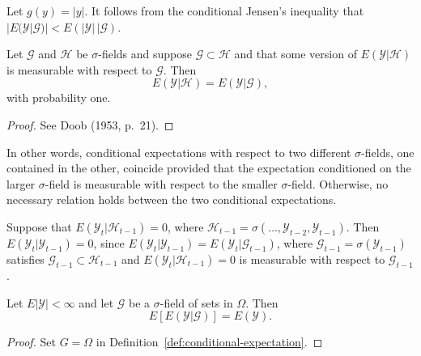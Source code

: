 \begin{example}\label{ex:cond-jensen-abs}
Let $g(y) = |y|$. It follows from the conditional Jensen's inequality that $|E(\mathcal{Y}|\mathcal{G})| < E(|\mathcal{Y}|\,|\mathcal{G})$.
\end{example}

\begin{proposition}\label{prop:cond-exp-subfield}
Let $\mathcal{G}$ and $\mathcal{H}$ be $\sigma$-fields and suppose $\mathcal{G} \subset \mathcal{H}$ and that some version of $E(\mathcal{Y}|\mathcal{H})$ is measurable with respect to $\mathcal{G}$. Then
\[
E(\mathcal{Y}|\mathcal{H}) = E(\mathcal{Y}|\mathcal{G}),
\]
with probability one.
\end{proposition}

\begin{proof}
See Doob (1953, p.~21). \qedhere
\end{proof}

In other words, conditional expectations with respect to two different $\sigma$-fields, one contained in the other, coincide provided that the expectation conditioned on the larger $\sigma$-field is measurable with respect to the smaller $\sigma$-field. Otherwise, no necessary relation holds between the two conditional expectations.

\begin{example}\label{ex:mds-subfield}
Suppose that $E(\mathcal{Y}_t | \mathcal{H}_{t-1}) = 0$, where $\mathcal{H}_{t-1} = \sigma(\ldots, \mathcal{Y}_{t-2}, \mathcal{Y}_{t-1})$. Then $E(\mathcal{Y}_t | \mathcal{Y}_{t-1}) = 0$, since $E(\mathcal{Y}_t | \mathcal{Y}_{t-1}) = E(\mathcal{Y}_t | \mathcal{G}_{t-1})$, where $\mathcal{G}_{t-1} = \sigma(\mathcal{Y}_{t-1})$ satisfies $\mathcal{G}_{t-1} \subset \mathcal{H}_{t-1}$ and $E(\mathcal{Y}_t | \mathcal{H}_{t-1}) = 0$ is measurable with respect to $\mathcal{G}_{t-1}$.
\end{example}

\begin{proposition}\label{prop:iterated-expectations}
Let $E|\mathcal{Y}| < \infty$ and let $\mathcal{G}$ be a $\sigma$-field of sets in $\Omega$. Then
\[
E[E(\mathcal{Y}|\mathcal{G})] = E(\mathcal{Y}).
\]
\end{proposition}

\begin{proof}
Set $G = \Omega$ in Definition~\ref{def:conditional-expectation}. \qedhere
\end{proof}


